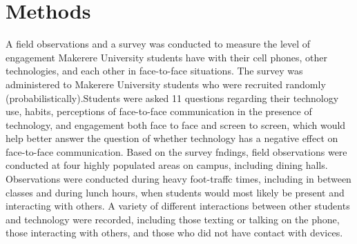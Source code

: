 \documentclass[11pt]{article} %
\begin{document}
\section{Methods}

A field observations and a survey was conducted to measure the level of engagement Makerere University students have with their cell phones, other technologies, and each other in face-to-face situations. 
The survey was administered to Makerere University students who were recruited randomly (probabilistically).Students were asked 11 questions regarding their technology use, habits, perceptions of face-to-face communication in the presence of technology, and engagement both face to face and screen to screen, which would help better answer the question of whether technology has a negative effect on face-to-face communication.
\newline Based on the survey fndings, field observations were conducted at four highly populated areas on campus, including dining halls. Observations were conducted during heavy foot-traffc times, including in between classes and during lunch hours, when students would most likely be present and interacting with others. A variety of different interactions between other students and technology were recorded, including those texting or talking on the phone, those interacting with others, and those who did not have contact with 
devices. 
\end{document}
